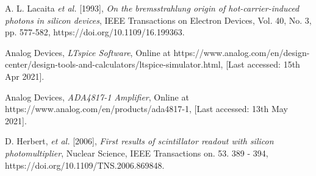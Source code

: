 \begin{thebibliography}{9}
A. L. Lacaita \textit{et al.} [1993],
\textit{On the bremsstrahlung origin of hot-carrier-induced photons in silicon devices},
IEEE Transactions on Electron Devices,
Vol. 40, No. 3, pp. 577-582,
https://doi.org/10.1109/16.199363.

Analog Devices,
\textit{LTspice Software},
Online at https://www.analog.com/en/design-center/design-tools-and-calculators/ltspice-simulator.html,
[Last accessed: 15th Apr 2021].

Analog Devices,
\textit{ADA4817-1 Amplifier},
Online at https://www.analog.com/en/products/ada4817-1,
[Last accessed: 13th May 2021].

D. Herbert, \textit{et al.} [2006],
\textit{First results of scintillator readout with silicon photomultiplier},
Nuclear Science, IEEE Transactions on. 53. 389 - 394,
https://doi.org/10.1109/TNS.2006.869848.

\end{thebibliography}
\endgroup
